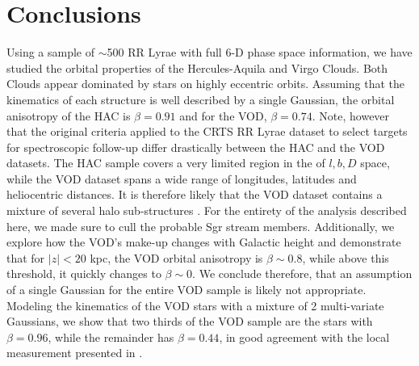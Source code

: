 \documentclass[fleqn,usenatbib]{mnras}
\begin{document}
\section{Conclusions}
%
Using a sample of $\sim$500 RR Lyrae with full 6-D phase space
information, we have studied the orbital properties of the
Hercules-Aquila and Virgo Clouds. Both Clouds appear dominated by
stars on highly eccentric orbits. Assuming that the kinematics of each
structure is well described by a single Gaussian, the orbital
anisotropy of the HAC is $\beta=0.91$ and for the VOD,
$\beta=0.74$. Note, however that the original criteria applied to the
CRTS RR Lyrae dataset to select targets for spectroscopic follow-up
differ drastically between the HAC and the VOD datasets. The HAC
sample covers a very limited region in the of $l,b, D$ space, while
the VOD dataset spans a wide range of longitudes, latitudes and
heliocentric distances. It is therefore likely that the VOD dataset
contains a mixture of several halo sub-structures \citep[see][for a
  detailed discussion]{Vivas2016}. For the entirety of the analysis
described here, we made sure to cull the probable Sgr stream
members. Additionally, we explore how the VOD's make-up changes with
Galactic height and demonstrate that for $|z|<20$ kpc, the VOD orbital
anisotropy is $\beta\sim 0.8$, while above this threshold, it quickly
changes to $\beta\sim0$. We conclude therefore, that an assumption of
a single Gaussian for the entire VOD sample is likely not
appropriate. Modeling the kinematics of the VOD stars with a mixture
of 2 multi-variate Gaussians, we show that two thirds of the VOD
sample are the stars with $\beta=0.96$, while the remainder has
$\beta=0.44$, in good agreement with the local measurement presented
in \citet{Belokurov2018}.
\end{document}
